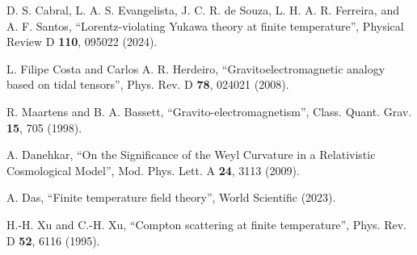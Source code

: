\documentclass[11pt,showpacs,preprintnumbers,amsmath,amssymb,prd,nofootinbib,superscriptaddress]{revtex4-2}
\begin{document}
\begin{thebibliography}{100}
 D. S. Cabral, L. A. S. Evangelista, J. C. R. de Souza, L. H. A. R. Ferreira, and A. F. Santos, ``Lorentz-violating Yukawa theory at finite temperature'',  {Physical Review D {\bf 110}, 095022 (2024).}

 L. Filipe Costa and Carlos A. R. Herdeiro, ``Gravitoelectromagnetic analogy based on tidal tensors'',
 {Phys. Rev. D {\bf 78}, 024021 (2008). }

R. Maartens and B. A. Bassett, ``Gravito-electromagnetism'', 
 {Class. Quant. Grav. {\bf 15}, 705 (1998).}

 A. Danehkar, ``On the Significance of the Weyl Curvature in a Relativistic Cosmological Model'',
 {Mod. Phys. Lett. A {\bf 24}, 3113 (2009).}

 A. Das, ``Finite temperature field theory'', \doi{} {World Scientific (2023).}

 H.-H. Xu and C.-H. Xu, ``Compton scattering at finite temperature'',  {Phys. Rev. D {\bf 52}, 6116 (1995).}





\end{thebibliography}
\end{document}
